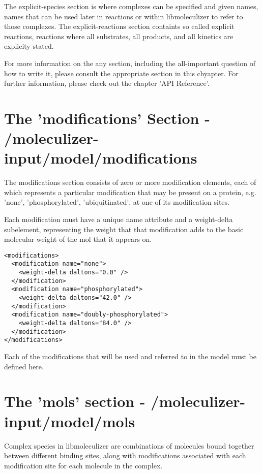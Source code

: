 The explicit-species section is where complexes can be specified and
given names, names that can be used later in reactions or within
libmoleculizer to refer to those complexes.  The explicit-reactions
section containts so called explicit reactions, reactions where all
substrates, all products, and all kinetics are explicity stated.  

For more information on the any section, including the all-important
question of how to write it, please consult the appropriate section in
this chyapter.  For further information, please check out the chapter
'API Reference'.  

\section{The 'modifications' Section -
  /moleculizer-input/model/modifications } 
\label{sec:modifications}

The modifications section consists of zero or more modification elements,
each of which represents a particular modification that may be present
on a protein, e.g. 'none', 'phosphorylated', 'ubiquitinated', at one
of its modification sites.

Each modification must have a unique name attribute and a weight-delta
subelement, representing the weight that that modification adds to the
basic molecular weight of the mol that it appears on.  

\lstset{language=XML}
\begin{lstlisting}[caption=A Sample Modifications Section, label=modifications ]
<modifications>
  <modification name="none">
    <weight-delta daltons="0.0" />
  </modification>
  <modification name="phosphorylated">
    <weight-delta daltons="42.0" />
  </modification>
  <modification name="doubly-phosphorylated">
    <weight-delta daltons="84.0" />
  </modification>
</modifications>
\end{lstlisting}

Each of the modifications that will be used and referred to in the
model must be defined here. 

\section{The 'mols' section - /moleculizer-input/model/mols}

Complex species in libmoleculizer are combinations of molecules bound
together between different binding sites, along with modifications
associated with each modification site for each molecule in the complex.  


